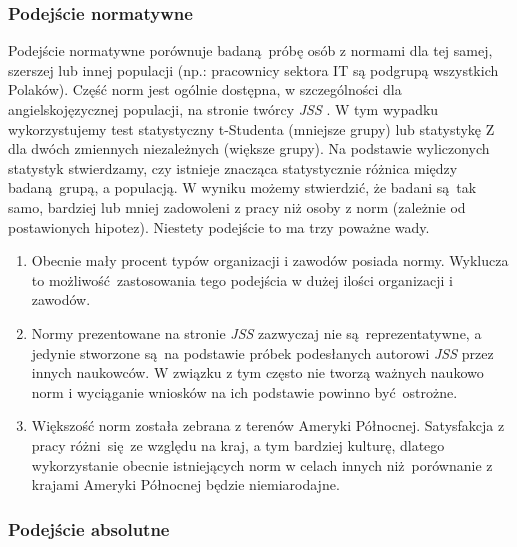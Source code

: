 \subsubsection{Podejście normatywne}
\label{sec:jss-calc-norm}
Podejście normatywne porównuje badaną próbę osób z normami dla tej samej, szerszej lub innej populacji (np.: pracownicy sektora IT są podgrupą wszystkich Polaków). Część norm jest ogólnie dostępna, w szczególności dla angielskojęzycznej populacji, na stronie twórcy \emph{JSS} \citep{web:jss-norms}. W tym wypadku wykorzystujemy test statystyczny t-Studenta (mniejsze grupy) lub statystykę Z dla dwóch zmiennych niezależnych (większe grupy). Na podstawie wyliczonych statystyk
stwierdzamy, czy istnieje znacząca statystycznie różnica między badaną grupą, a populacją. W wyniku możemy stwierdzić, że badani są tak samo, bardziej lub mniej zadowoleni z pracy niż osoby z norm (zależnie od postawionych hipotez). Niestety podejście to
ma trzy poważne wady.
\begin{enumerate}
\item Obecnie mały procent typów organizacji i zawodów posiada normy. Wyklucza to możliwość zastosowania tego podejścia w dużej ilości organizacji i zawodów.
\item Normy prezentowane na stronie \emph{JSS} zazwyczaj nie są reprezentatywne, a jedynie stworzone są na podstawie próbek podesłanych autorowi \emph{JSS} przez innych naukowców. W związku z tym często nie tworzą ważnych naukowo norm i wyciąganie wniosków na ich podstawie powinno być ostrożne.
\item Większość norm została zebrana z terenów Ameryki Północnej. Satysfakcja z pracy różni się ze względu na kraj, a tym bardziej kulturę, dlatego wykorzystanie obecnie istniejących norm w celach innych niż porównanie z krajami Ameryki Północnej będzie niemiarodajne.
\end{enumerate}
 
\subsubsection{Podejście absolutne}

